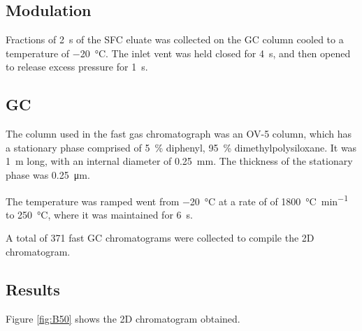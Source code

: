 \subsection{Modulation}

Fractions of \SI{2}{\second} of the SFC eluate was collected on the GC column
cooled to a temperature of \SI{-20}{\celsius}. The inlet vent was held closed
for \SI{4}{\second}, and then opened to release excess pressure for
\SI{1}{\second}.

\subsection{GC}

The column used in the fast gas chromatograph was an OV-5 column, which has a
stationary phase comprised of \SI{5}{\percent} diphenyl, \SI{95}{\percent}
dimethylpolysiloxane. It was \SI{1}{\metre} long, with an internal diameter of
\SI{0.25}{\milli\metre}. The thickness of the stationary phase was
\SI{0.25}{\micro\metre}.

The temperature was ramped went from \SI{-20}{\celsius} at a rate of of
\SI{1800}{\celsius\per\minute} to \SI{250}{\celsius}, where it was maintained
for \SI{6}{s}.

A total of 371 fast GC chromatograms were collected to compile the 2D chromatogram. 

\subsection{Results}

Figure \ref{fig:B50} shows the 2D chromatogram obtained. 

